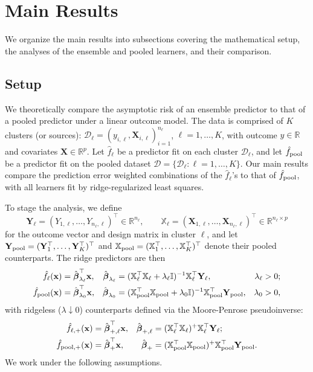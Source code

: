 \documentclass{article}
\theoremstyle{plain}
\theoremstyle{remark}
\def \bx{\mathbf{x}}
\def \bX{\mathbf{X}}
\def \bX{\boldsymbol{X}}
\begin{document}
\section{Main Results}
We organize the main results into subsections covering the mathematical setup, the analyses of the ensemble and pooled learners, and their comparison.

\subsection{Setup}\label{sec:setup}
We theoretically compare the asymptotic risk of an ensemble predictor to that of a pooled predictor under a linear outcome model. The data is comprised of $K$ clusters (or sources): $\mathcal{D}_\ell=(y_{i,\ell},\bX_{i,\ell})_{i=1}^{n_\ell}$, $\ell=1,\ldots,K$, with outcome $y\in\mathbb{R}$ and covariates $\bX\in\mathbb{R}^p$. Let $\hat{f}_\ell$ be a predictor fit on each cluster $\mathcal{D}_\ell$, and let $\hat{f}_{\rm pool}$ be a predictor fit on the pooled dataset $\mathcal{D}=\{\mathcal{D}_\ell:\ell=1,\ldots,K\}$. Our main results compare the prediction error weighted combinations of the $\hat{f}_\ell$'s to that of $\hat{f}_{\rm pool}$, with all learners fit by ridge-regularized least squares.

To stage the analysis, we define
\[
\mathbf{Y}_\ell=(Y_{1,\ell},\ldots,Y_{n_\ell,\ell})^\top\in\mathbb{R}^{n_\ell},
\qquad
\mathbb{X}_\ell=(\bX_{1,\ell},\ldots,\bX_{n_\ell,\ell})^\top\in\mathbb{R}^{n_\ell\times p}
\]
for the outcome vector and design matrix in cluster $\ell$, and let $\mathbf{Y}_{\rm pool}=(\mathbf{Y}_1^\top,\ldots,\mathbf{Y}_K^\top)^\top$ and $\mathbb{X}_{\rm pool}=(\mathbb{X}_1^\top,\ldots,\mathbb{X}_K^\top)^\top$ denote their pooled counterparts. The ridge predictors are then
\begin{align*}
\hat{f}_\ell(\bx)
 &=\hat{\boldsymbol{\beta}}_{\lambda_\ell}^\top\bx,
&\hat{\boldsymbol{\beta}}_{\lambda_\ell}
 &=(\mathbb{X}_\ell^\top\mathbb{X}_\ell+\lambda_\ell\mathbb{I})^{-1}\mathbb{X}_\ell^\top\mathbf{Y}_\ell,
&\lambda_\ell&>0;\\
\hat{f}_{\rm pool}(\bx)
 &=\hat{\boldsymbol{\beta}}_{\lambda_0}^\top\bx,
&\hat{\boldsymbol{\beta}}_{\lambda_0}
 &=(\mathbb{X}_{\rm pool}^\top\mathbb{X}_{\rm pool}+\lambda_0\mathbb{I})^{-1}\mathbb{X}_{\rm pool}^\top\mathbf{Y}_{\rm pool},
&\lambda_0&>0,
\end{align*}
with ridgeless ($\lambda\downarrow 0$) counterparts defined via the Moore-Penrose pseudoinverse:
\begin{align*}
\hat{f}_{\ell,+}(\bx)
 &=\hat{\boldsymbol{\beta}}_{+,\ell}^\top\bx,
&\hat{\boldsymbol{\beta}}_{+,\ell}
 &=(\mathbb{X}_\ell^\top\mathbb{X}_\ell)^+\mathbb{X}_\ell^\top\mathbf{Y}_\ell;\\
\hat{f}_{\rm pool,+}(\bx)
 &=\hat{\boldsymbol{\beta}}_{+}^\top\bx,
&\hat{\boldsymbol{\beta}}_{+}
 &=(\mathbb{X}_{\rm pool}^\top\mathbb{X}_{\rm pool})^+\mathbb{X}_{\rm pool}^\top\mathbf{Y}_{\rm pool}.
\end{align*}
We work under the following assumptions.
\end{document}
